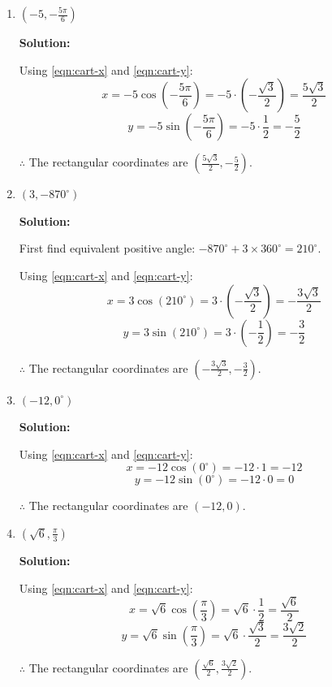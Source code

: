 \documentclass[a4paper]{article}
\begin{document}
\begin{enumerate}
    \(\therefore\) The rectangular coordinates are \((-\sqrt{3}, 1)\).
    
    \item \(\left( -5, -\frac{5\pi}{6} \right)\)
    
    \textbf{Solution:}
    
    Using \cref{eqn:cart-x} and \cref{eqn:cart-y}:
    \[
    x = -5\cos\left(-\frac{5\pi}{6}\right) = -5 \cdot \left(-\frac{\sqrt{3}}{2}\right) = \frac{5\sqrt{3}}{2}
    \]
    \[
    y = -5\sin\left(-\frac{5\pi}{6}\right) = -5 \cdot \frac{1}{2} = -\frac{5}{2}
    \]
    
    \(\therefore\) The rectangular coordinates are \(\left( \frac{5\sqrt{3}}{2}, -\frac{5}{2} \right)\).
    
    \item \((3, -870^\circ)\)
    
    \textbf{Solution:}
    
    First find equivalent positive angle:
    \(-870^\circ + 3 \times 360^\circ = 210^\circ\).
    
    Using \cref{eqn:cart-x} and \cref{eqn:cart-y}:
    \[
    x = 3\cos(210^\circ) = 3 \cdot \left(-\frac{\sqrt{3}}{2}\right) = -\frac{3\sqrt{3}}{2}
    \]
    \[
    y = 3\sin(210^\circ) = 3 \cdot \left(-\frac{1}{2}\right) = -\frac{3}{2}
    \]
    
    \(\therefore\) The rectangular coordinates are \(\left( -\frac{3\sqrt{3}}{2}, -\frac{3}{2} \right)\).
    
    \item \((-12, 0^\circ)\)
    
    \textbf{Solution:}
    
    Using \cref{eqn:cart-x} and \cref{eqn:cart-y}:
    \[
    x = -12\cos(0^\circ) = -12 \cdot 1 = -12
    \]
    \[
    y = -12\sin(0^\circ) = -12 \cdot 0 = 0
    \]
    
    \(\therefore\) The rectangular coordinates are \((-12, 0)\).
    
    \item \(\left( \sqrt{6}, \frac{\pi}{3} \right)\)
    
    \textbf{Solution:}
    
    Using \cref{eqn:cart-x} and \cref{eqn:cart-y}:
    \[
    x = \sqrt{6}\cos\left(\frac{\pi}{3}\right) = \sqrt{6} \cdot \frac{1}{2} = \frac{\sqrt{6}}{2}
    \]
    \[
    y = \sqrt{6}\sin\left(\frac{\pi}{3}\right) = \sqrt{6} \cdot \frac{\sqrt{3}}{2} = \frac{3\sqrt{2}}{2}
    \]
    
    \(\therefore\) The rectangular coordinates are \(\left( \frac{\sqrt{6}}{2}, \frac{3\sqrt{2}}{2} \right)\).
\end{enumerate}


  
\end{document}
